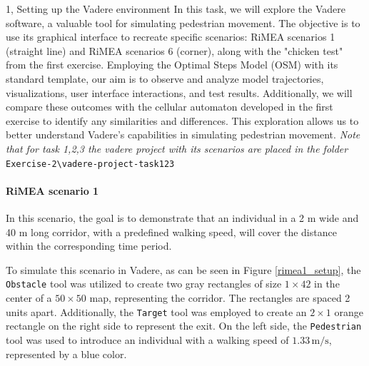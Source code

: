 \begin{task}{1, Setting up the Vadere environment}
In this task, we will explore the Vadere software, a valuable tool for simulating pedestrian movement. The objective is to use its graphical interface to recreate specific scenarios: RiMEA scenarios 1 (straight line) and RiMEA scenarios 6 (corner), along with the "chicken test" from the first exercise. Employing the Optimal Steps Model (OSM) with its standard template, our aim is to observe and analyze model trajectories, visualizations, user interface interactions, and test results. Additionally, we will compare these outcomes with the cellular automaton developed in the first exercise to identify any similarities and differences. This exploration allows us to better understand Vadere's capabilities in simulating pedestrian movement. \textit{Note that for task 1,2,3 the vadere project with its scenarios are placed in the folder} \verb+Exercise-2\vadere-project-task123+

\paragraph{RiMEA scenario 1}
In this scenario, the goal is to demonstrate that an individual in a 2 m wide and 40 m long corridor, with a predefined walking speed, will cover the distance within the corresponding time period.

To simulate this scenario in Vadere, as can be seen in Figure \ref{rimea1_setup}, the \texttt{Obstacle} tool was utilized to create two gray rectangles of size $1 \times 42$ in the center of a $50 \times 50$ map, representing the corridor. The rectangles are spaced 2 units apart. Additionally, the \texttt{Target} tool was employed to create an $2 \times 1$ orange rectangle on the right side to represent the exit. On the left side, the \texttt{Pedestrian} tool was used to introduce an individual with a walking speed of $1.33 \, \text{m/s}$, represented by a blue color.


\end{task}
